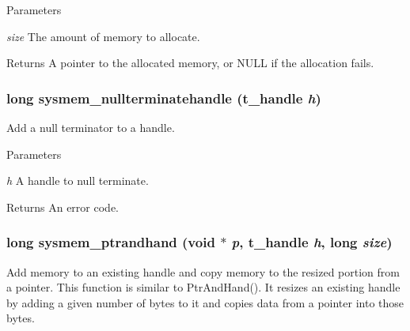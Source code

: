 \begin{DoxyParams}{Parameters}
\item[{\em size}]The amount of memory to allocate. \end{DoxyParams}
\begin{DoxyReturn}{Returns}
A pointer to the allocated memory, or NULL if the allocation fails. 
\end{DoxyReturn}
\hypertarget{group__memory_ga2d07c8171a047d92e8bd95f8bb5b2a70}{
\subsubsection[{sysmem\_\-nullterminatehandle}]{\setlength{\rightskip}{0pt plus 5cm}long sysmem\_\-nullterminatehandle ({\bf t\_\-handle} {\em h})}}
\label{group__memory_ga2d07c8171a047d92e8bd95f8bb5b2a70}


Add a null terminator to a handle. 
\begin{DoxyParams}{Parameters}
\item[{\em h}]A handle to null terminate. \end{DoxyParams}
\begin{DoxyReturn}{Returns}
An error code. 
\end{DoxyReturn}
\hypertarget{group__memory_gab59295d789b6a720b9ab981a39441cbc}{
\subsubsection[{sysmem\_\-ptrandhand}]{\setlength{\rightskip}{0pt plus 5cm}long sysmem\_\-ptrandhand (void $\ast$ {\em p}, \/  {\bf t\_\-handle} {\em h}, \/  long {\em size})}}
\label{group__memory_gab59295d789b6a720b9ab981a39441cbc}


Add memory to an existing handle and copy memory to the resized portion from a pointer. This function is similar to PtrAndHand(). It resizes an existing handle by adding a given number of bytes to it and copies data from a pointer into those bytes.



